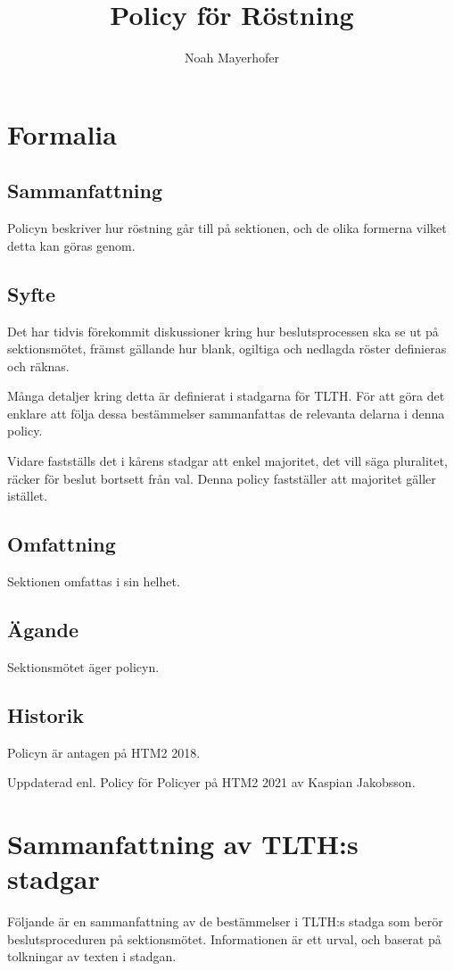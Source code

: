 \documentclass{dsekprotokoll}
\title{Policy för Röstning}
\author{Noah Mayerhofer}
\begin{document}
\maketitle
\section{Formalia}
\subsection{Sammanfattning}
Policyn beskriver hur röstning går till på sektionen, och de olika formerna vilket detta kan göras genom.
\subsection{Syfte}
Det har tidvis förekommit diskussioner kring hur beslutsprocessen ska se ut på sektionsmötet,
främst gällande hur blank, ogiltiga och nedlagda röster definieras och räknas.


Många detaljer kring detta är definierat i stadgarna för TLTH. För att göra det enklare att följa
dessa bestämmelser sammanfattas de relevanta delarna i denna policy.


Vidare fastställs det i kårens stadgar att enkel majoritet, det vill säga pluralitet, räcker för beslut
bortsett från val. Denna policy fastställer att majoritet gäller istället.

\subsection{Omfattning}
Sektionen omfattas i sin helhet.

\subsection{Ägande}
Sektionsmötet äger policyn.

\subsection{Historik}
Policyn är antagen på HTM2 2018.

Uppdaterad enl. Policy för Policyer på HTM2 2021 av Kaspian Jakobsson.


\section{Sammanfattning av TLTH:s stadgar}
Följande är en sammanfattning av de bestämmelser i TLTH:s stadga som berör beslutsproceduren på sektionsmötet. Informationen är ett urval, och baserat på tolkningar av texten i stadgan.
\end{document}
